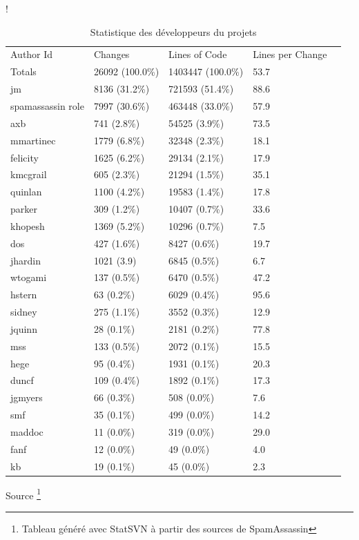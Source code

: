 \documentclass[a4paper,11pt]{article}
\begin{document}
\begin{table}[ht]!
 
\begin{center}
\begin{tabular}{lllll}

\rowcolor{tcA}
 Author Id & Changes & Lines of Code & Lines per Change\\
\rowcolor{tcA}
 Totals & 26092 (100.0\%) & 1403447 (100.0\%) & 53.7\\
\rowcolor{tcA}
  jm & 8136 (31.2\%) & 721593 (51.4\%) & 88.6\\
\rowcolor{tcA}
  spamassassin role & 7997 (30.6\%) & 463448 (33.0\%) & 57.9\\
\rowcolor{tcA}
  axb & 741 (2.8\%) & 54525 (3.9\%) & 73.5\\
\rowcolor{tcA}
  mmartinec & 1779 (6.8\%) & 32348 (2.3\%) & 18.1\\
\rowcolor{tcA}
  felicity & 1625 (6.2\%) & 29134 (2.1\%) & 17.9\\
\rowcolor{tcA}
  kmcgrail & 605 (2.3\%) & 21294 (1.5\%) & 35.1\\
\rowcolor{tcA}
  quinlan & 1100 (4.2\%) & 19583 (1.4\%) & 17.8\\
\rowcolor{tcA}
  parker & 309 (1.2\%) & 10407 (0.7\%) & 33.6\\
\rowcolor{tcA}
  khopesh & 1369 (5.2\%) & 10296 (0.7\%) & 7.5\\
\rowcolor{tcA}
  dos & 427 (1.6\%) & 8427 (0.6\%) & 19.7\\
\rowcolor{tcA}
  jhardin & 1021 (3.9) & 6845 (0.5\%) & 6.7\\
\rowcolor{tcA}
  wtogami & 137 (0.5\%) & 6470 (0.5\%) & 47.2\\
\rowcolor{tcA}
  hstern & 63 (0.2\%) & 6029 (0.4\%) & 95.6\\
\rowcolor{tcA}
  sidney & 275 (1.1\%) & 3552 (0.3\%) & 12.9\\
\rowcolor{tcA}
  jquinn & 28 (0.1\%) & 2181 (0.2\%) & 77.8\\
\rowcolor{tcA}
  mss & 133 (0.5\%) & 2072 (0.1\%) & 15.5\\
\rowcolor{tcA}
 hege & 95 (0.4\%) & 1931 (0.1\%) & 20.3\\
\rowcolor{tcA}
 duncf & 109 (0.4\%) & 1892 (0.1\%) & 17.3\\
\rowcolor{tcA}
  jgmyers & 66 (0.3\%) & 508 (0.0\%) & 7.6\\
\rowcolor{tcA}
  smf & 35 (0.1\%) & 499 (0.0\%) & 14.2\\
\rowcolor{tcA}
  maddoc & 11 (0.0\%) & 319 (0.0\%) & 29.0\\
\rowcolor{tcA}
  fanf & 12 (0.0\%) & 49 (0.0\%) & 4.0\\
\rowcolor{tcA}
  kb & 19 (0.1\%) & 45 (0.0\%) & 2.3
\end{tabular}
\caption{Statistique des développeurs du projets }
\footnotesize{Source \footnote{Tableau généré avec StatSVN à partir des sources de SpamAssassin}}
\label{tab:devs}
\end{center}
\end{table}
\end{document}
